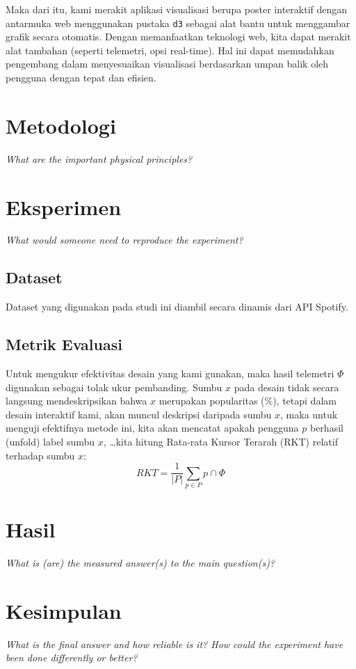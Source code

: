 \documentclass[11pt,a4paper]{article}
\begin{document}
Maka dari itu, kami merakit aplikasi visualisasi berupa poster interaktif
dengan antarmuka web menggunakan pustaka \texttt{d3} \cite{bostock2011d3}
sebagai alat bantu untuk menggambar grafik secara otomatis. Dengan memanfaatkan
teknologi web, kita dapat merakit alat tambahan (seperti telemetri, opsi
real-time). Hal ini dapat memudahkan pengembang dalam menyesuaikan visualisasi
berdasarkan umpan balik oleh pengguna dengan tepat dan efisien.

\section{Metodologi}
\textit{What are the important physical principles?}\\

\section{Eksperimen}
\textit{What would someone need to reproduce the experiment?}\\

\subsection{Dataset}
Dataset yang digunakan pada studi ini diambil secara dinamis dari API Spotify.

\subsection{Metrik Evaluasi}
Untuk mengukur efektivitas desain yang kami gunakan, maka hasil
telemetri $\Phi$ digunakan sebagai tolak ukur pembanding. Sumbu $x$
pada desain tidak secara langsung mendeskripsikan bahwa $x$ merupakan
popularitas (\%), tetapi dalam desain interaktif kami, akan muncul
deskripsi daripada sumbu $x$, maka untuk menguji efektifnya
metode ini, kita akan mencatat apakah pengguna $p$ berhasil (unfold) label
sumbu $x$, \ldots kita hitung Rata-rata Kursor Terarah (RKT) relatif
terhadap sumbu $x$:
\begin{equation}
RKT = \frac{1}{|P|} \sum_{p \in P}{p \cap \Phi}
\end{equation}

\section{Hasil}
\textit{What is (are) the measured answer(s) to the main question(s)?}\\

\section{Kesimpulan}
\textit{What is the final answer and how reliable is it? How could the experiment have been done differently or better?}\\

\renewcommand{\refname}{Referensi}

 
\end{document}
